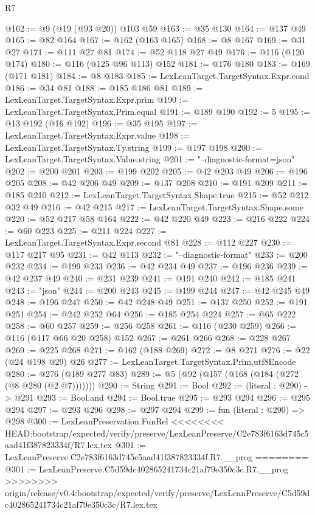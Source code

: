 \begin{lexlean}{R7}
\begin{coremodule}
{{{{{{{{{{{{{@162 := @9 (@19 (@93 @20)) @103 @59
@163 := @35 @130
@164 := @137 @49
@165 := @82 @164
@167 := @162 (@163 @165)
@168 := @8 @167
@169 := @31 @27
@171 := @111 @27 @81
@174 := @52 @118 @27 @49
@176 := @116 (@120 @174)
@180 := @116 (@125 @96 @113) @152
@181 := @176 @180
@183 := @169 (@171 @181)
@184 := @8 @183
@185 := LexLeanTarget.TargetSyntax.Expr.cond
@186 := @34 @81
@188 := @185 @186 @81
@189 := LexLeanTarget.TargetSyntax.Expr.prim
@190 := LexLeanTarget.TargetSyntax.Prim.equal
@191 := @189 @190
@192 := 5
@195 := @13 @192 (@16 @192)
@196 := @35 @195
@197 := LexLeanTarget.TargetSyntax.Expr.value
@198 := LexLeanTarget.TargetSyntax.Ty.string
@199 := @197 @198
@200 := LexLeanTarget.TargetSyntax.Value.string
@201 := "--diagnostic-format=json"
@202 := @200 @201
@203 := @199 @202
@205 := @42 @203 @49
@206 := @196 @205
@208 := @42 @206 @49
@209 := @137 @208
@210 := @191 @209
@211 := @185 @210
@212 := LexLeanTarget.TargetSyntax.Shape.true
@215 := @52 @212 @32 @49
@216 := @42 @215
@217 := LexLeanTarget.TargetSyntax.Shape.some
@220 := @52 @217 @58 @164
@222 := @42 @220 @49
@223 := @216 @222
@224 := @60 @223
@225 := @211 @224
@227 := LexLeanTarget.TargetSyntax.Expr.second @81
@228 := @112 @227
@230 := @117 @217 @95
@231 := @42 @113
@232 := "--diagnostic-format"
@233 := @200 @232
@234 := @199 @233
@236 := @42 @234 @49
@237 := @196 @236
@239 := @42 @237 @49
@240 := @231 @239
@241 := @191 @240
@242 := @185 @241
@243 := "json"
@244 := @200 @243
@245 := @199 @244
@247 := @42 @245 @49
@248 := @196 @247
@250 := @42 @248 @49
@251 := @137 @250
@252 := @191 @251
@254 := @242 @252 @64
@256 := @185 @254 @224
@257 := @65 @222
@258 := @60 @257
@259 := @256 @258
@261 := @116 (@230 @259)
@266 := @116 (@117 @66 @20 @258) @152
@267 := @261 @266
@268 := @228 @267
@269 := @225 @268
@271 := @162 (@188 @269)
@272 := @8 @271
@276 := @22 (@24 @198 @29) @26
@277 := LexLeanTarget.TargetSyntax.Prim.utf8Encode
@280 := @276 (@189 @277 @83)
@289 := @5 (@92 (@157 (@168 (@184 (@272 (@8 @280 (@2 @7)))))))
@290 := String
@291 := Bool
@292 := (literal : @290) -> @291
@293 := Bool.and
@294 := Bool.true
@295 := @293 @294
@296 := @295 @294
@297 := @293 @296
@298 := @297 @294
@299 := fun (literal : @290) => @298
@300 := LexLeanPreservation.FunRel
<<<<<<<< HEAD:bootstrap/expected/verify/preserve/LexLeanPreserve/C2e783f6163d745c5aad41f387823334f/R7.lex.tex
@301 := LexLeanPreserve.C2e783f6163d745c5aad41f387823334f.R7.__prog
========
@301 := LexLeanPreserve.C5d59dc402865241734c21af79e350c3c.R7.__prog
>>>>>>>> origin/release/v0.4:bootstrap/expected/verify/preserve/LexLeanPreserve/C5d59dc402865241734c21af79e350c3c/R7.lex.tex
}}}}}}}}}}}}}
\end{coremodule}
\end{lexlean}
